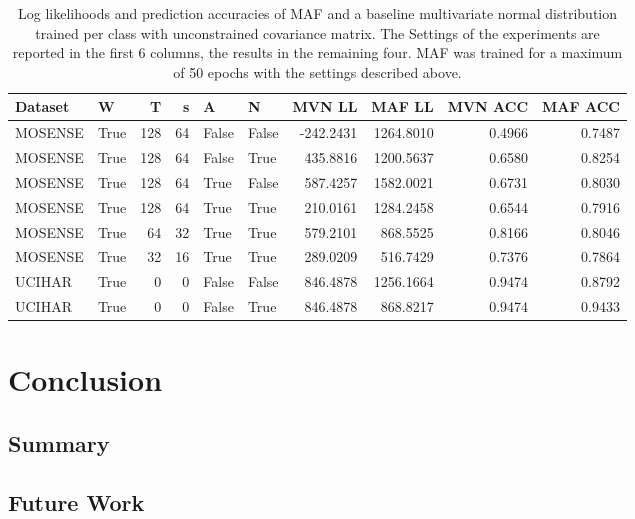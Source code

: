 \documentclass[11pt,titlepage,oneside,openany]{book}
\begin{document}
\begin{table}
	\tiny
	\begin{tabularx}{\textwidth}{llrrllrrrr}
		\toprule
		Dataset &  W &  T &  s &  A &  N &    MVN LL &    MAF LL &  MVN ACC &  MAF ACC \\
		\midrule
		MOSENSE &    True &     128 &      64 &    False &  False & -242.2431 & 1264.8010 &   0.4966 &   0.7487 \\
		MOSENSE &    True &     128 &      64 &    False &   True &  435.8816 & 1200.5637 &   0.6580 &   0.8254 \\
		MOSENSE &    True &     128 &      64 &     True &  False &  587.4257 & 1582.0021 &   0.6731 &   0.8030 \\
		MOSENSE &    True &     128 &      64 &     True &   True &  210.0161 & 1284.2458 &   0.6544 &   0.7916 \\
		MOSENSE &    True &      64 &      32 &     True &   True &  579.2101 &  868.5525 &   0.8166 &   0.8046 \\
		MOSENSE &    True &      32 &      16 &     True &   True &  289.0209 &  516.7429 &   0.7376 &   0.7864 \\
		UCIHAR &    True &       0 &       0 &    False &  False &  846.4878 & 1256.1664 &   0.9474 &   0.8792 \\
		UCIHAR &    True &       0 &       0 &    False &   True &  846.4878 &  868.8217 &   0.9474 &   0.9433 \\
		\bottomrule
	\end{tabularx}
	\caption{\label{tab:eps50} Log likelihoods and prediction accuracies of MAF and a baseline multivariate normal distribution trained per class with unconstrained covariance matrix. The Settings of the experiments are reported in the first 6 columns, the results in the remaining four. MAF was trained for a maximum of 50 epochs with the settings described above.}
\end{table}




\chapter{Conclusion}
\label{cha:conclusion}


\section{Summary}
\label{sec:sum}


\section{Future Work}
\label{sec:future}
\end{document}

